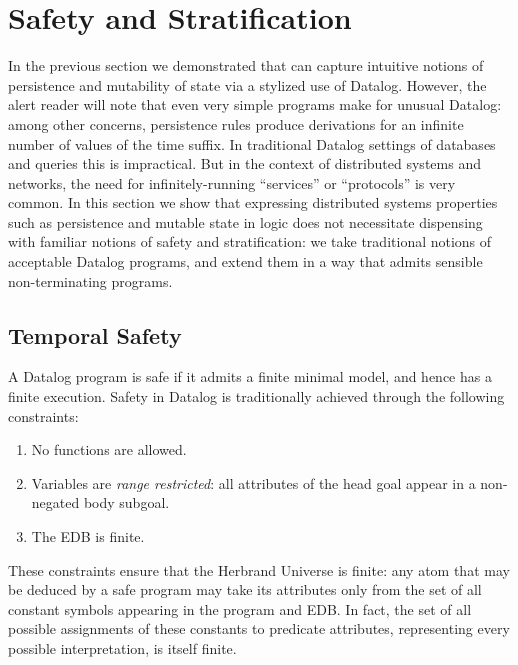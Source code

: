 \section{Safety and Stratification}

In the previous section we demonstrated that \slang can capture intuitive
notions of persistence and mutability of state via a stylized use of Datalog.
However, the alert reader will note that even very simple \slang programs make
for unusual Datalog: among other concerns, persistence rules produce
derivations for an infinite number of values of the time suffix.  In
traditional Datalog settings of databases and queries this is impractical.  But
in the context of distributed systems and networks, the need for
infinitely-running ``services'' or ``protocols'' is very common.  In this
section we show that expressing distributed systems properties such as
persistence and mutable state in logic does not necessitate dispensing with
familiar notions of safety and stratification: we take traditional notions of
acceptable Datalog programs, and extend them in a way that admits sensible
non-terminating programs.

\subsection{Temporal Safety}
A Datalog program is safe if it admits a finite minimal model, and hence has
a finite execution.  Safety in Datalog is traditionally achieved
through the following constraints:

\begin{enumerate}
%
\item No functions are allowed.
%
\item Variables are \emph{range restricted}: all attributes of the head goal
appear in a non-negated body subgoal.
%
\item The EDB is finite.
%
\end{enumerate}

These constraints ensure that the Herbrand Universe is finite: any atom that
may be deduced by a safe program may take its attributes only from the 
set of all constant symbols appearing in the program and EDB.
In fact, the set of all possible assignments of these constants to predicate
attributes, representing every possible interpretation, is itself finite. 

